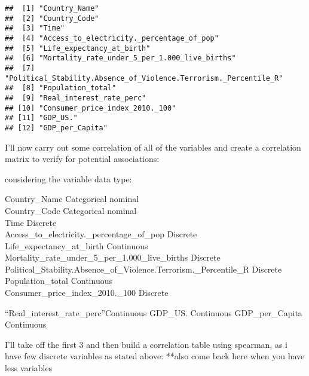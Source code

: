 \documentclass[
]{article}
\begin{document}
\begin{verbatim}
##  [1] "Country_Name"                                                   
##  [2] "Country_Code"                                                   
##  [3] "Time"                                                           
##  [4] "Access_to_electricity._percentage_of_pop"                       
##  [5] "Life_expectancy_at_birth"                                       
##  [6] "Mortality_rate_under_5_per_1.000_live_births"                   
##  [7] "Political_Stability.Absence_of_Violence.Terrorism._Percentile_R"
##  [8] "Population_total"                                               
##  [9] "Real_interest_rate_perc"                                        
## [10] "Consumer_price_index_2010._100"                                 
## [11] "GDP_US."                                                        
## [12] "GDP_per_Capita"
\end{verbatim}

I'll now carry out some correlation of all of the variables and create a
correlation matrix to verify for potential associations:

considering the variable data type:

Country\_Name \textbar{} Categorical nominal \textbar{}\\
Country\_Code \textbar{} Categorical nominal \textbar{}\\
Time \textbar{} Discrete \textbar{}\\
Access\_to\_electricity.\_percentage\_of\_pop \textbar{} Discrete
\textbar{}\\
Life\_expectancy\_at\_birth \textbar{} Continuous \textbar{}\\
Mortality\_rate\_under\_5\_per\_1.000\_live\_births \textbar{} Discrete
\textbar{}\\
Political\_Stability.Absence\_of\_Violence.Terrorism.\_Percentile\_R
\textbar{} Discrete \textbar{}\\
Population\_total \textbar{} Continuous \textbar{}\\
Consumer\_price\_index\_2010.\_100 \textbar{} Discrete \textbar{}

``Real\_interest\_rate\_perc''\textbar Continuous \textbar{} GDP\_US.
\textbar{} Continuous \textbar{} \textbar{} GDP\_per\_Capita \textbar{}
Continuous \textbar{}

I'll take off the first 3 and then build a correlation table using
spearman, as i have few discrete variables as stated above: **also come
back here when you have less variables
\end{document}
